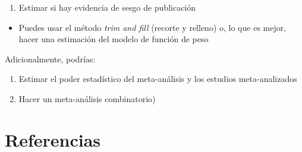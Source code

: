 \documentclass[
  bookmarksnumbered]{article}
\providecommand{\tightlist}{%
  \setlength{\itemsep}{0pt}\setlength{\parskip}{0pt}}
\begin{document}
\begin{enumerate}
\def\labelenumi{\arabic{enumi}.}
\setcounter{enumi}{1}
\tightlist
\item
  Estimar si hay evidencia de sesgo de publicación
\end{enumerate}

\begin{itemize}
\tightlist
\item
  Puedes usar el método \emph{trim and fill} (recorte y relleno) o, lo que es mejor, hacer una estimación del modelo de función de peso
\end{itemize}

Adicionalmente, podrías:

\begin{enumerate}
\def\labelenumi{\arabic{enumi}.}
\setcounter{enumi}{2}
\item
  Estimar el poder estadístico del meta-análisis y los estudios meta-analizados
\item
  Hacer un meta-análisis combinatorio)
\end{enumerate}

\newpage

\hypertarget{referencias}{%
\section{Referencias}\label{referencias}}
\end{document}
